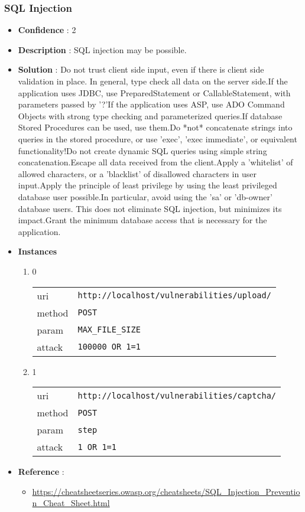 \documentclass[10pt]{article}
\begin{document}
\subsubsection{SQL Injection}
\begin{itemize}
\item[] \textbf{Confidence} : 2
\item[] \textbf{Description} : SQL injection may be possible.
\item[] \textbf{Solution} :  Do not trust client side input, even if there is client side validation in place.  In general, type check all data on the server side.If the application uses JDBC, use PreparedStatement or CallableStatement, with parameters passed by '?'If the application uses ASP, use ADO Command Objects with strong type checking and parameterized queries.If database Stored Procedures can be used, use them.Do *not* concatenate strings into queries in the stored procedure, or use 'exec', 'exec immediate', or equivalent functionality!Do not create dynamic SQL queries using simple string concatenation.Escape all data received from the client.Apply a 'whitelist' of allowed characters, or a 'blacklist' of disallowed characters in user input.Apply the principle of least privilege by using the least privileged database user possible.In particular, avoid using the 'sa' or 'db-owner' database users. This does not eliminate SQL injection, but minimizes its impact.Grant the minimum database access that is necessary for the application.
\item[] \textbf{Instances}
\begin{enumerate}
\item[] 0
\begin{tabular}{| l | p{12cm}}
uri & \texttt{http://localhost/vulnerabilities/upload/} \\
method & \texttt{POST} \\
param & \texttt{MAX\_FILE\_SIZE} \\
attack & \texttt{100000 OR 1=1} \\
\end{tabular}
\item[] 1
\begin{tabular}{| l | p{12cm}}
uri & \texttt{http://localhost/vulnerabilities/captcha/} \\
method & \texttt{POST} \\
param & \texttt{step} \\
attack & \texttt{1 OR 1=1} \\
\end{tabular}
\end{enumerate}
\item[] \textbf{Reference} : 
\begin{itemize}
\item \url{https://cheatsheetseries.owasp.org/cheatsheets/SQL\_Injection\_Prevention\_Cheat\_Sheet.html}
\end{itemize}
\end{itemize}
\end{document}
